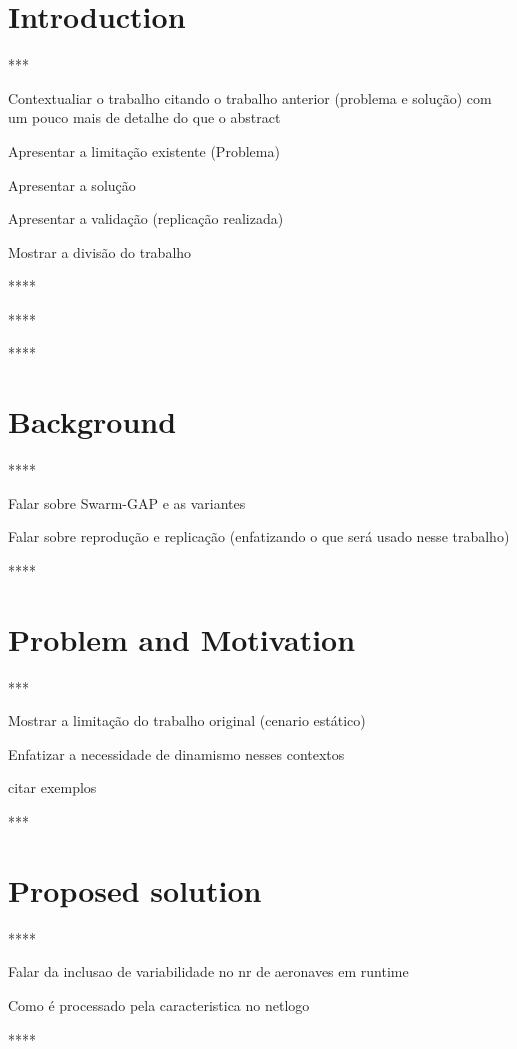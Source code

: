 \documentclass[review]{elsarticle}
\begin{document}

\section{Introduction} \label{sec:introduction}
*** 

Contextualiar o trabalho citando o trabalho anterior (problema e solução) com um pouco mais de detalhe do que o abstract

Apresentar a limitação existente (Problema)

Apresentar a solução

Apresentar a validação (replicação realizada)

Mostrar a divisão do trabalho

****

****

****




\section{Background}\label{sec:background}
****

Falar sobre Swarm-GAP e as variantes

Falar sobre reprodução e replicação (enfatizando o que será usado nesse trabalho)

****




\section{Problem and Motivation}\label{sec:problem}
***

Mostrar a limitação do trabalho original (cenario estático)

Enfatizar a necessidade de dinamismo nesses contextos

citar exemplos

***




\section{Proposed solution}\label{sec:methods}
****

Falar da inclusao de variabilidade no nr de aeronaves em runtime

Como é processado pela caracteristica no netlogo

****
%
\end{document}
